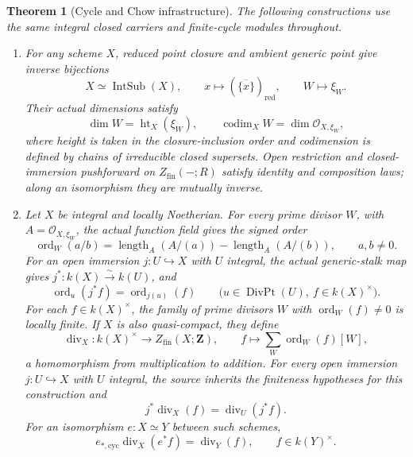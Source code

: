 \documentclass[11pt]{article}
\newtheorem{theorem}{Theorem}[section]
\theoremstyle{definition}
\theoremstyle{remark}
\begin{document}
\begin{theorem}[Cycle and Chow infrastructure]
\label{thm:cycle-chow-infrastructure}
The following constructions use the same integral closed carriers and
finite-cycle modules throughout.

\begin{enumerate}[label=\textup{(\roman*)},leftmargin=*]
\item
For any scheme \(X\), reduced point closure and ambient generic
point give inverse bijections
\[
  X\simeq\operatorname{IntSub}(X),\qquad
  x\longmapsto(\overline{\{x\}})_{\mathrm{red}},
  \qquad W\longmapsto\xi_W.
\]
Their actual dimensions satisfy
\[
  \dim W=\operatorname{ht}_X(\xi_W),\qquad
  \operatorname{codim}_X W=\dim\mathcal O_{X,\xi_W},
\]
where height is taken in the closure-inclusion order and codimension
is defined by chains of irreducible closed supersets. Open restriction and closed-immersion pushforward on
\(Z_{\mathrm{fin}}(-;R)\) satisfy identity and composition laws;
along an isomorphism they are mutually inverse.

\item
Let \(X\) be integral and locally Noetherian. For every prime
divisor \(W\), with \(A=\mathcal O_{X,\xi_W}\), the actual function
field gives the signed order
\[
  \operatorname{ord}_W(a/b)
    =\operatorname{length}_A(A/(a))
       -\operatorname{length}_A(A/(b)),
  \qquad a,b\ne0.
\]
For an open immersion \(j:U\hookrightarrow X\) with \(U\) integral,
the actual generic-stalk map gives
\(j^*:k(X)\xrightarrow{\sim}k(U)\), and
\[
 \operatorname{ord}_u(j^*f)=\operatorname{ord}_{j(u)}(f)
 \qquad\bigl(u\in\operatorname{DivPt}(U),\ f\in k(X)^\times\bigr).
\]
For each \(f\in k(X)^\times\), the family of prime divisors
\(W\) with \(\operatorname{ord}_W(f)\ne0\) is locally finite.
If \(X\) is also quasi-compact, they define
\[
  \operatorname{div}_X:k(X)^\times\longrightarrow
      Z_{\mathrm{fin}}(X;\mathbf Z),\qquad
  f\longmapsto\sum_W\operatorname{ord}_W(f)[W],
\]
a homomorphism from multiplication to addition.
For every open immersion \(j:U\hookrightarrow X\) with \(U\) integral,
the source inherits the finiteness hypotheses for this construction and
\[
 j^*\operatorname{div}_X(f)=\operatorname{div}_U(j^*f).
\]
For an isomorphism \(e:X\simeq Y\) between such schemes,
\[
 e_{*,\mathrm{cyc}}\operatorname{div}_X(e^*f)
   =\operatorname{div}_Y(f),\qquad f\in k(Y)^\times.
\]


\end{enumerate}
\end{theorem}
\end{document}
